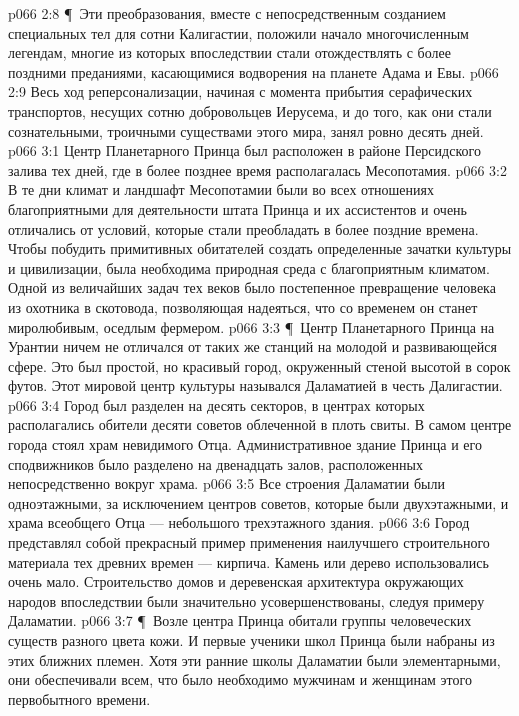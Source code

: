 \vs p066 2:8 \P\ Эти преобразования, вместе с непосредственным созданием специальных тел для сотни Калигастии, положили начало многочисленным легендам, многие из которых впоследствии стали отождествлять с более поздними преданиями, касающимися водворения на планете Адама и Евы.
\vs p066 2:9 Весь ход реперсонализации, начиная с момента прибытия серафических транспортов, несущих сотню добровольцев Иерусема, и до того, как они стали сознательными, троичными существами этого мира, занял ровно десять дней.
\vs p066 3:1 Центр Планетарного Принца был расположен в районе Персидского залива тех дней, где в более позднее время располагалась Месопотамия.
\vs p066 3:2 В те дни климат и ландшафт Месопотамии были во всех отношениях благоприятными для деятельности штата Принца и их ассистентов и очень отличались от условий, которые стали преобладать в более поздние времена. Чтобы побудить примитивных обитателей создать определенные зачатки культуры и цивилизации, была необходима природная среда с благоприятным климатом. Одной из величайших задач тех веков было постепенное превращение человека из охотника в скотовода, позволяющая надеяться, что со временем он станет миролюбивым, оседлым фермером.
\vs p066 3:3 \P\ Центр Планетарного Принца на Урантии ничем не отличался от таких же станций на молодой и развивающейся сфере. Это был простой, но красивый город, окруженный стеной высотой в сорок футов. Этот мировой центр культуры назывался Даламатией в честь Далигастии.
\vs p066 3:4 Город был разделен на десять секторов, в центрах которых располагались обители десяти советов облеченной в плоть свиты. В самом центре города стоял храм невидимого Отца. Административное здание Принца и его сподвижников было разделено на двенадцать залов, расположенных непосредственно вокруг храма.
\vs p066 3:5 Все строения Даламатии были одноэтажными, за исключением центров советов, которые были двухэтажными, и храма всеобщего Отца --- небольшого трехэтажного здания.
\vs p066 3:6 Город представлял собой прекрасный пример применения наилучшего строительного материала тех древних времен --- кирпича. Камень или дерево использовались очень мало. Строительство домов и деревенская архитектура окружающих народов впоследствии были значительно усовершенствованы, следуя примеру Даламатии.
\vs p066 3:7 \P\ Возле центра Принца обитали группы человеческих существ разного цвета кожи. И первые ученики школ Принца были набраны из этих ближних племен. Хотя эти ранние школы Даламатии были элементарными, они обеспечивали всем, что было необходимо мужчинам и женщинам этого первобытного времени.
